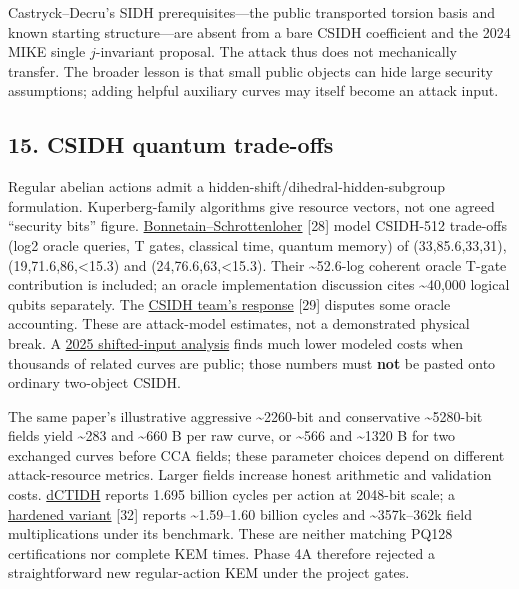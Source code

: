 \documentclass[
  10pt,
  a4paper,
]{article}
\begin{document}
Castryck--Decru's SIDH prerequisites---the public transported torsion
basis and known starting structure---are absent from a bare CSIDH
coefficient and the 2024 MIKE single \(j\)-invariant proposal. The
attack thus does not mechanically transfer. The broader lesson is that
small public objects can hide large security assumptions; adding helpful
auxiliary curves may itself become an attack input.

\hypertarget{csidh-quantum-trade-offs}{%
\subsection{15. CSIDH quantum
trade-offs}\label{csidh-quantum-trade-offs}}

Regular abelian actions admit a hidden-shift/dihedral-hidden-subgroup
formulation. Kuperberg-family algorithms give resource vectors, not one
agreed ``security bits'' figure.
\href{https://zhengxuisogeny.github.io/Isogeny-Based-Cryptography/index/quantumcsidh.pdf}{Bonnetain--Schrottenloher}
{[}28{]} model CSIDH-512 trade-offs (log2 oracle queries, T gates,
classical time, quantum memory) of (33,85.6,33,31),
(19,71.6,86,\textless15.3) and (24,76.6,63,\textless15.3). Their
\textasciitilde52.6-log coherent oracle T-gate contribution is included;
an oracle implementation discussion cites \textasciitilde40,000 logical
qubits separately. The
\href{https://csidh.isogeny.org/analysis.html}{CSIDH team's response}
{[}29{]} disputes some oracle accounting. These are attack-model
estimates, not a demonstrated physical break. A
\href{https://eprint.iacr.org/2025/376}{2025 shifted-input analysis}
finds much lower modeled costs when thousands of related curves are
public; those numbers must \textbf{not} be pasted onto ordinary
two-object CSIDH.

The same paper's illustrative aggressive \textasciitilde2260-bit and
conservative \textasciitilde5280-bit fields yield \textasciitilde283 and
\textasciitilde660 B per raw curve, or \textasciitilde566 and
\textasciitilde1320 B for two exchanged curves before CCA fields; these
parameter choices depend on different attack-resource metrics. Larger
fields increase honest arithmetic and validation costs.
\href{https://eprint.iacr.org/2025/107}{dCTIDH} reports 1.695 billion
cycles per action at 2048-bit scale; a
\href{https://arxiv.org/abs/2509.12877}{hardened variant} {[}32{]}
reports \textasciitilde1.59--1.60 billion cycles and
\textasciitilde357k--362k field multiplications under its benchmark.
These are neither matching PQ128 certifications nor complete KEM times.
Phase 4A therefore rejected a straightforward new regular-action KEM
under the project gates.
\end{document}
